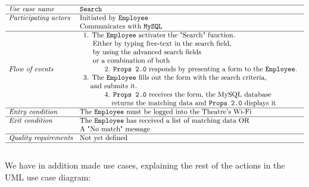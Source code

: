 \documentclass[12pt]{article}
\begin{document}
\[
\begin{array}{ll}
\hline
\textit{Use case name} & \texttt{Search} \\
\hline
\textit{Participating actors} & \text{Initiated by \texttt{Employee}} \\
& \text{Communicates with \texttt{MySQL}} \\
\hline
\textit{Flow of events} & 
\begin{array}{l}
\text{1. The \texttt{Employee} activates the "Search" function.} \\
\quad \text{ Either by typing free-text in the search field,} \\
\quad \text{ by using the advanced search fields} \\
\quad \text{ or a combination of both}\\
\quad \quad \quad \text{2. \texttt{Props 2.0} responds by presenting a form to the \texttt{Employee}.} \\
\text{3. The \texttt{Employee} fills out the form with the search criteria,} \\ \quad \text{and submits it.} \\
\quad \quad \quad \text{4. \texttt{Props 2.0} receives the form, the MySQL database} \\ \quad \quad \quad \quad \text{returns the matching data and \texttt{Props 2.0} displays it}
\end{array} \\
\hline
\textit{Entry condition} & \text{The \texttt{Employee} must be logged into the Theatre's Wi-Fi} \\
\hline
\textit{Exit condition} & \text{The \texttt{Employee} has received a list of matching data OR} \\ & \text{A "No match"  message} \\
\hline
\textit{Quality requirements} & \text{Not yet defined} \\
\hline
\end{array}
\]
\\
We have in addition made use cases, explaining the rest of the actions in the UML use case diagram: \\
\end{document}
